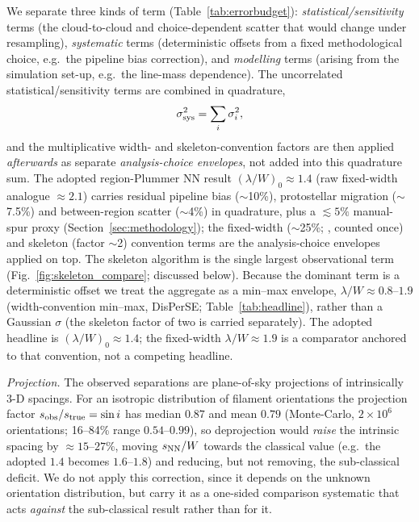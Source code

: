 \documentclass[usenatbib,twoside,twocolumn]{mnras}
\begin{document}
We separate three kinds of term (Table~\ref{tab:errorbudget}): \emph{statistical/sensitivity} terms (the cloud-to-cloud and choice-dependent scatter that would change under resampling), \emph{systematic} terms (deterministic offsets from a fixed methodological choice, e.g.\ the pipeline bias correction), and \emph{modelling} terms (arising from the simulation set-up, e.g.\ the line-mass dependence). The uncorrelated statistical/sensitivity terms are combined in quadrature,
\begin{equation}
\sigma_{\rm sys}^2=\sum_i\sigma_i^2,
\label{eq:quadrature}
\end{equation}
and the multiplicative width- and skeleton-convention factors are then applied \emph{afterwards} as separate \emph{analysis-choice envelopes}, not added into this quadrature sum. The adopted region-Plummer NN result $(\lambda/W)_0\approx1.4$ (raw fixed-width analogue $\approx2.1$) carries residual pipeline bias ($\sim$10\%), protostellar migration ($\sim$7.5\%) and between-region scatter ($\sim$4\%) in quadrature, plus a $\lesssim5\%$ manual-spur proxy (Section~\ref{sec:methodology}); the fixed-width ($\sim$25\%; \citealt{Panopoulou2022}, counted once) and skeleton (factor $\sim$2) convention terms are the analysis-choice envelopes applied on top. The skeleton algorithm is the single largest observational term (Fig.~\ref{fig:skeleton_compare}; discussed below). Because the dominant term is a deterministic offset we treat the aggregate as a min--max envelope, $\lambda/W\approx0.8$--$1.9$ (width-convention min--max, DisPerSE; Table~\ref{tab:headline}), rather than a Gaussian $\sigma$ (the skeleton factor of two is carried separately). The adopted headline is $(\lambda/W)_0\approx1.4$; the fixed-width $\lambda/W\approx1.9$ is a comparator anchored to that convention, not a competing headline.

\emph{Projection.} The observed separations are plane-of-sky projections of intrinsically 3-D spacings. For an isotropic distribution of filament orientations the projection factor $s_{\rm obs}/s_{\rm true}=\sin i$ has median $0.87$ and mean $0.79$ (Monte-Carlo, $2\times10^6$ orientations; 16--84\% range $0.54$--$0.99$), so deprojection would \emph{raise} the intrinsic spacing by $\approx15$--$27\%$, moving $s_{\rm NN}/W$ towards the classical value (e.g.\ the adopted $1.4$ becomes $1.6$--$1.8$) and reducing, but not removing, the sub-classical deficit. We do not apply this correction, since it depends on the unknown orientation distribution, but carry it as a one-sided comparison systematic that acts \emph{against} the sub-classical result rather than for it.
\end{document}
